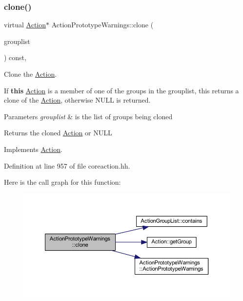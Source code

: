 \subsubsection{\texorpdfstring{clone()}{clone()}}
{\footnotesize\ttfamily virtual \mbox{\hyperlink{class_action}{Action}}$\ast$ Action\+Prototype\+Warnings\+::clone (\begin{DoxyParamCaption}\item[{const \mbox{\hyperlink{class_action_group_list}{Action\+Group\+List}} \&}]{grouplist }\end{DoxyParamCaption}) const\hspace{0.3cm}{\ttfamily [inline]}, {\ttfamily [virtual]}}



Clone the \mbox{\hyperlink{class_action}{Action}}. 

If {\bfseries{this}} \mbox{\hyperlink{class_action}{Action}} is a member of one of the groups in the grouplist, this returns a clone of the \mbox{\hyperlink{class_action}{Action}}, otherwise N\+U\+LL is returned. 
\begin{DoxyParams}{Parameters}
{\em grouplist} & is the list of groups being cloned \\
\hline
\end{DoxyParams}
\begin{DoxyReturn}{Returns}
the cloned \mbox{\hyperlink{class_action}{Action}} or N\+U\+LL 
\end{DoxyReturn}


Implements \mbox{\hyperlink{class_action_af8242e41d09e5df52f97df9e65cc626f}{Action}}.



Definition at line 957 of file coreaction.\+hh.

Here is the call graph for this function\+:
\nopagebreak
\begin{figure}[H]
\begin{center}
\leavevmode
\includegraphics[width=350pt]{class_action_prototype_warnings_afe5d4ac774bbeb80c6be7bcdc2578de5_cgraph}
\end{center}
\end{figure}


